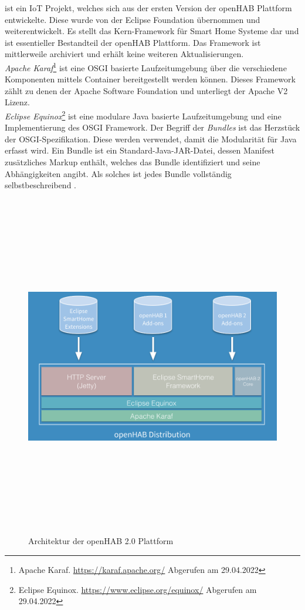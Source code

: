     ist ein \acs{IoT} Projekt, welches sich aus der ersten Version der openHAB Plattform entwickelte. 
    Diese wurde von der Eclipse Foundation übernommen und weiterentwickelt. Es stellt das Kern-Framework für Smart Home Systeme dar 
    und ist essentieller Bestandteil der openHAB Plattform. Das Framework ist mittlerweile archiviert und erhält keine weiteren 
    Aktualisierungen.
    \\
    \linebreak
    \textit{Apache Karaf}\footnote{Apache Karaf. \url{https://karaf.apache.org/} Abgerufen am 29.04.2022} 
    ist eine \acs{OSGI} basierte Laufzeitumgebung über die verschiedene Komponenten mittels Container 
    bereitgestellt werden können. Dieses Framework zählt zu denen der Apache Software Foundation und unterliegt der Apache V2 Lizenz.
    \\
    \linebreak
    \textit{Eclipse Equinox}\footnote{Eclipse Equinox. \url{https://www.eclipse.org/equinox/} Abgerufen am 29.04.2022} ist eine modulare 
    Java basierte Laufzeitumgebung und eine Implementierung des \acs{OSGI} Framework. Der Begriff der \textit{Bundles} ist das 
    Herzstück der \acs{OSGI}-Spezifikation. Diese werden verwendet, damit die Modularität für Java erfasst wird. Ein Bundle ist 
    ein Standard-Java-JAR-Datei, dessen Manifest zusätzliches Markup enthält, welches das Bundle identifiziert und seine Abhängigkeiten 
    angibt. Als solches ist jedes Bundle vollständig selbstbeschreibend \cite{openHAB-article}. 
    \begin{figure}[hbt!]
        \centering
        \includegraphics[width=15cm,height=15cm,keepaspectratio]{images/openhab-2-architecture.png}
        \caption{Architektur der openHAB 2.0 Plattform \cite{kaikreutzer2016}}
        \label{fig:architectureopenHAB2}
    \end{figure}
